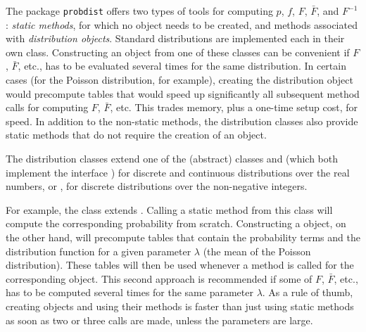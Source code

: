 The package \texttt{probdist} offers two types of tools for computing 
$p$, $f$, $F$, $\bar{F}$, and $F^{-1}$: 
\emph{static methods}, for which no object needs to
be created, and methods associated with \emph{distribution objects}.
Standard distributions are implemented each in their own class.
Constructing an object from one of these classes can be convenient 
if $F$, $\bar{F}$, etc., has to be evaluated several times for the same
distribution. In certain cases (for the Poisson distribution, for example),
creating the distribution object would precompute tables that
would speed up significantly all subsequent method calls for computing
$F$, $\bar{F}$, etc. 
This trades memory, plus a one-time setup cost, for speed.
In addition to the non-static methods, the distribution classes also
provide static methods that do not require the creation of an object.

The distribution classes extend one of the (abstract) classes
 and
(which both implement the interface
)
for discrete and continuous distributions over the real numbers,
or ,
for discrete distributions over the non-negative integers.

For example, the class
  extends 
.
Calling a static method from this class
will compute the corresponding probability from scratch.
Constructing a  
object, on the other hand,
will precompute tables that contain the probability terms and the 
distribution function for a given parameter $\lambda$ (the mean of the
Poisson distribution).  These tables will then be used whenever
a method is called for the corresponding object.
This second approach is recommended if some of $F$, $\bar{F}$, etc., 
has to be computed several times for the same parameter $\lambda$.
As a rule of thumb, creating objects and using their methods
is faster than just using static methods as soon as two or three
calls are made, unless the parameters are large.

